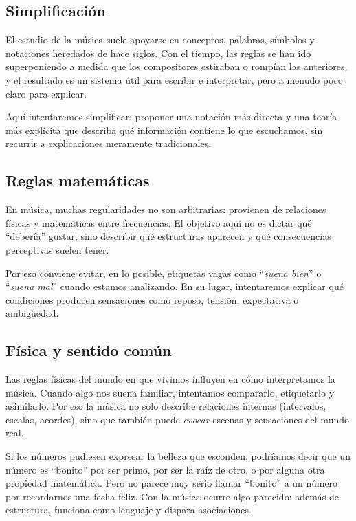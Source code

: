 \documentclass[]{report}
\begin{document}
\subsection{Simplificación}

El estudio de la música suele apoyarse en conceptos, palabras, símbolos y notaciones heredados de hace siglos. Con el tiempo, las reglas se han ido superponiendo a medida que los compositores estiraban o rompían las anteriores, y el resultado es un sistema útil para escribir e interpretar, pero a menudo poco claro para explicar.

Aquí intentaremos simplificar: proponer una notación más directa y una teoría más explícita que describa qué información contiene lo que escuchamos, sin recurrir a explicaciones meramente tradicionales.

\subsection{Reglas matemáticas}

En música, muchas regularidades no son arbitrarias: provienen de relaciones físicas y matemáticas entre frecuencias. El objetivo aquí no es dictar qué ``debería'' gustar, sino describir qué estructuras aparecen y qué consecuencias perceptivas suelen tener.

Por eso conviene evitar, en lo posible, etiquetas vagas como ``\emph{suena bien}'' o ``\emph{suena mal}'' cuando estamos analizando. En su lugar, intentaremos explicar qué condiciones producen sensaciones como reposo, tensión, expectativa o ambigüedad.

\subsection{Física y sentido común}

Las reglas físicas del mundo en que vivimos influyen en cómo interpretamos la música. Cuando algo nos suena familiar, intentamos compararlo, etiquetarlo y asimilarlo. Por eso la música no solo describe relaciones internas (intervalos, escalas, acordes), sino que también puede \emph{evocar} escenas y sensaciones del mundo real.

Si los números pudiesen expresar la belleza que esconden, podríamos decir que un número es ``bonito'' por ser primo, por ser la raíz de otro, o por alguna otra propiedad matemática. Pero no parece muy serio llamar ``bonito'' a un número por recordarnos una fecha feliz. Con la música ocurre algo parecido: además de estructura, funciona como lenguaje y dispara asociaciones.
\end{document}

